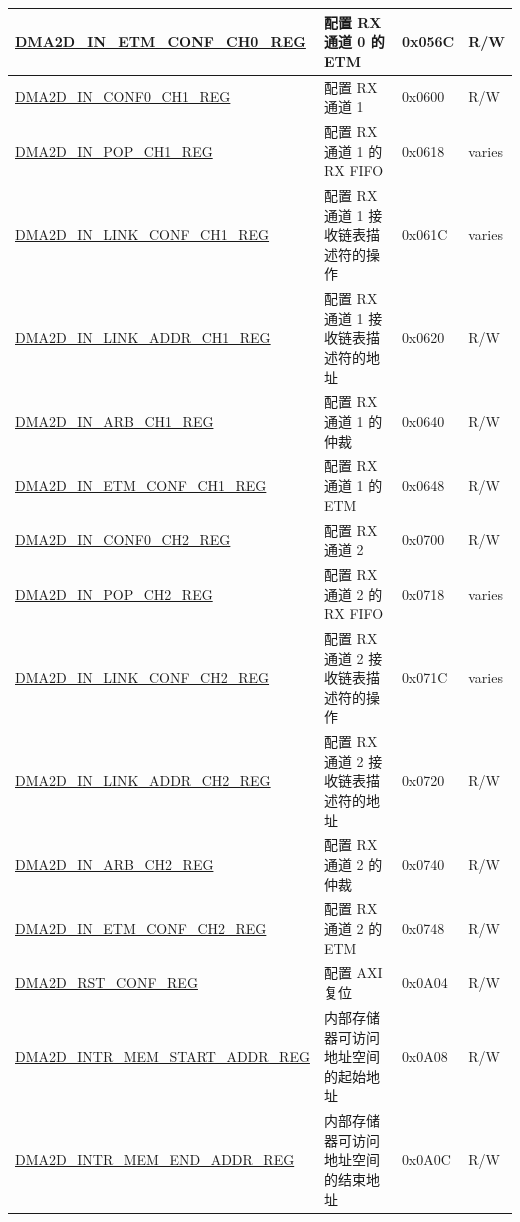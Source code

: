 \begin{longtable}{ | p{7cm} | p{11.5cm} | p{1.3cm} | p{2cm} | }
\hyperref[regdesc:DMA2DINETMCONFCHNREG]{DMA2D\_IN\_ETM\_CONF\_CH0\_REG} & 配置 RX 通道 0 的 ETM & 0x056C & R/W \\ \hline
\hyperref[regdesc:DMA2DINCONF0CHNREG]{DMA2D\_IN\_CONF0\_CH1\_REG} & 配置 RX 通道 1 & 0x0600 & R/W \\ \hline
\hyperref[regdesc:DMA2DINPOPCHNREG]{DMA2D\_IN\_POP\_CH1\_REG} & 配置 RX 通道 1 的 RX FIFO & 0x0618 & varies \\ \hline
\hyperref[regdesc:DMA2DINLINKCONFCHNREG]{DMA2D\_IN\_LINK\_CONF\_CH1\_REG} & 配置 RX 通道 1 接收链表描述符的操作 & 0x061C & varies \\ \hline
\hyperref[regdesc:DMA2DINLINKADDRCHNREG]{DMA2D\_IN\_LINK\_ADDR\_CH1\_REG} & 配置 RX 通道 1 接收链表描述符的地址 & 0x0620 & R/W \\ \hline
\hyperref[regdesc:DMA2DINARBCHNREG]{DMA2D\_IN\_ARB\_CH1\_REG} & 配置 RX 通道 1 的仲裁 & 0x0640 & R/W \\ \hline
\hyperref[regdesc:DMA2DINETMCONFCHNREG]{DMA2D\_IN\_ETM\_CONF\_CH1\_REG} & 配置 RX 通道 1 的 ETM & 0x0648 & R/W \\ \hline
\hyperref[regdesc:DMA2DINCONF0CHNREG]{DMA2D\_IN\_CONF0\_CH2\_REG} & 配置 RX 通道 2 & 0x0700 & R/W \\ \hline
\hyperref[regdesc:DMA2DINPOPCHNREG]{DMA2D\_IN\_POP\_CH2\_REG} & 配置 RX 通道 2 的 RX FIFO & 0x0718 & varies \\ \hline
\hyperref[regdesc:DMA2DINLINKCONFCHNREG]{DMA2D\_IN\_LINK\_CONF\_CH2\_REG} & 配置 RX 通道 2 接收链表描述符的操作 & 0x071C & varies \\ \hline
\hyperref[regdesc:DMA2DINLINKADDRCHNREG]{DMA2D\_IN\_LINK\_ADDR\_CH2\_REG} & 配置 RX 通道 2 接收链表描述符的地址 & 0x0720 & R/W \\ \hline
\hyperref[regdesc:DMA2DINARBCHNREG]{DMA2D\_IN\_ARB\_CH2\_REG} & 配置 RX 通道 2 的仲裁 & 0x0740 & R/W \\ \hline
\hyperref[regdesc:DMA2DINETMCONFCHNREG]{DMA2D\_IN\_ETM\_CONF\_CH2\_REG} & 配置 RX 通道 2 的 ETM & 0x0748 & R/W \\ \hline
\hyperref[regdesc:DMA2DRSTCONFREG]{DMA2D\_RST\_CONF\_REG} & 配置 AXI 复位 & 0x0A04 & R/W \\ \hline
\hyperref[regdesc:DMA2DINTRMEMSTARTADDRREG]{DMA2D\_INTR\_MEM\_START\_ADDR\_REG} & 内部存储器可访问地址空间的起始地址 & 0x0A08 & R/W \\ \hline
\hyperref[regdesc:DMA2DINTRMEMENDADDRREG]{DMA2D\_INTR\_MEM\_END\_ADDR\_REG} & 内部存储器可访问地址空间的结束地址 & 0x0A0C & R/W \\ \hline

\end{longtable}
